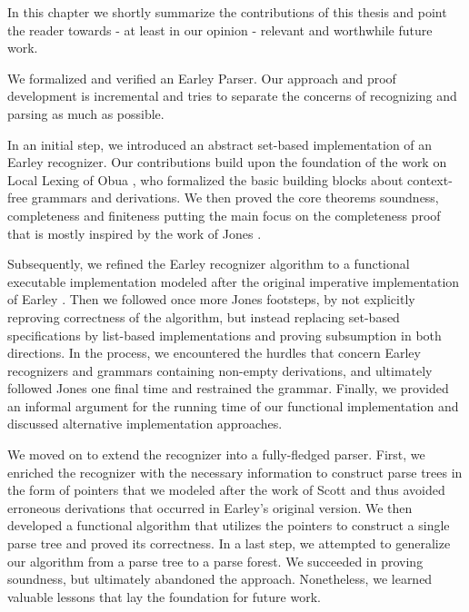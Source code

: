 %
\begin{isabellebody}%
%
%
\isadelimtheory
%
\endisadelimtheory
%
\isatagtheory
%
\endisatagtheory
{\isafoldtheory}%
%
\isadelimtheory
%
\endisadelimtheory
%
\isadelimdocument
%
\endisadelimdocument
%
\isatagdocument
%
\isamarkuptrue%
%
\endisatagdocument
{\isafolddocument}%
%
\isadelimdocument
%
\endisadelimdocument
%
\begin{isamarkuptext}%
In this chapter we shortly summarize the contributions of this thesis and point the reader towards
- at least in our opinion - relevant and worthwhile future work.%
\end{isamarkuptext}\isamarkuptrue%
%
\isadelimdocument
%
\endisadelimdocument
%
\isatagdocument
%
\isamarkuptrue%
%
\endisatagdocument
{\isafolddocument}%
%
\isadelimdocument
%
\endisadelimdocument
%
\begin{isamarkuptext}%
We formalized and verified an Earley Parser. Our approach and proof development is incremental and
tries to separate the concerns of recognizing and parsing as much as possible.

In an initial step, we introduced an abstract set-based implementation of an Earley recognizer. Our contributions
build upon the foundation of the work on Local Lexing of Obua \cite{Obua:2017} \cite{LocalLexing-AFP},
who formalized the basic building blocks about context-free grammars and derivations. We then proved
the core theorems soundness, completeness and finiteness putting the main focus on the completeness proof
that is mostly inspired by the work of Jones \cite{Jones:1972}.

Subsequently, we refined the Earley recognizer algorithm to a functional executable implementation modeled
after the original imperative implementation of Earley \cite{Earley:1970}. Then we followed once more
Jones footsteps, by not explicitly reproving correctness of the algorithm, but instead replacing set-based
specifications by list-based implementations and proving subsumption in both directions. In the process,
we encountered the hurdles that concern Earley recognizers and grammars containing non-empty derivations, and
ultimately followed Jones one final time and restrained the grammar. Finally, we provided an informal argument
for the running time of our functional implementation and discussed alternative implementation approaches.

We moved on to extend the recognizer into a fully-fledged parser. First, we enriched the recognizer with
the necessary information to construct parse trees in the form of pointers that we modeled after the work
of Scott \cite{Scott:2008} and thus avoided erroneous derivations that occurred in Earley's original
version. We then developed a functional algorithm that utilizes the pointers to construct a single parse tree
and proved its correctness. In a last step, we attempted to generalize our algorithm from a parse tree to
a parse forest. We succeeded in proving soundness, but ultimately abandoned the approach.
Nonetheless, we learned valuable lessons that lay the foundation for future work.


\end{isamarkuptext}
\end{isabellebody}
